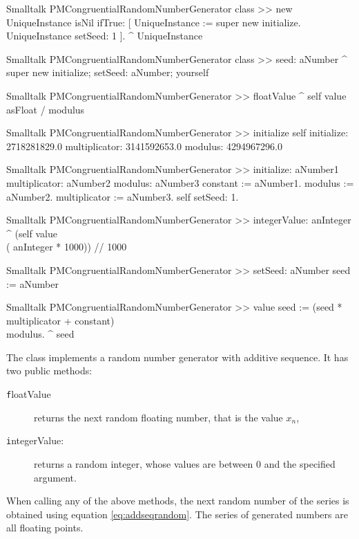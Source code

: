 \begin{displaycode}{Smalltalk}
PMCongruentialRandomNumberGenerator class >> new
    UniqueInstance isNil
        ifTrue: [ UniqueInstance := super new initialize.
                     UniqueInstance setSeed: 1 ].
    ^ UniqueInstance
\end{displaycode}

\begin{displaycode}{Smalltalk}
PMCongruentialRandomNumberGenerator class >> seed: aNumber
    ^ super new initialize; setSeed: aNumber; yourself
\end{displaycode}

\begin{displaycode}{Smalltalk}
PMCongruentialRandomNumberGenerator >> floatValue
    ^ self value asFloat / modulus
\end{displaycode}

\begin{displaycode}{Smalltalk}
PMCongruentialRandomNumberGenerator >> initialize
    self initialize: 2718281829.0 multiplicator: 3141592653.0 
                                                modulus: 4294967296.0
\end{displaycode}

\begin{displaycode}{Smalltalk}
PMCongruentialRandomNumberGenerator >> initialize: aNumber1 multiplicator: aNumber2 modulus: aNumber3
    constant := aNumber1.
    modulus := aNumber2.
    multiplicator := aNumber3.
    self setSeed: 1.
\end{displaycode}

\begin{displaycode}{Smalltalk}
PMCongruentialRandomNumberGenerator >> integerValue: anInteger
    ^ (self value \\ ( anInteger * 1000)) // 1000
\end{displaycode}

\begin{displaycode}{Smalltalk}
PMCongruentialRandomNumberGenerator >> setSeed: aNumber
    seed := aNumber
\end{displaycode}

\begin{displaycode}{Smalltalk}
PMCongruentialRandomNumberGenerator >> value
    seed := (seed * multiplicator + constant) \\ modulus.
    ^ seed
\end{displaycode}

\noindent The class  implements a random number generator with additive sequence.
It has two public methods:
\begin{description}
  \item[\texttt floatValue] returns the next random floating number,
  that is the value $x_n$,
  \item[\texttt integerValue:] returns a random integer, whose values
  are between 0 and the specified argument.
\end{description}
When calling any of the above methods, the next random number of
the series is obtained using equation \ref{eq:addseqrandom}. The
series of generated numbers are all floating points.

